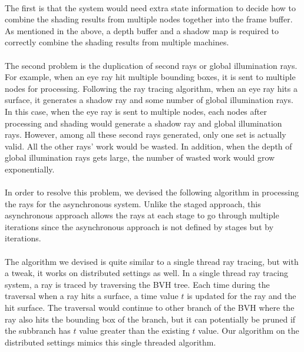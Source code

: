 \documentclass[a4paper, oneside, 10pt]{article}
\begin{document}
\paragraph{} The first is that the system would need extra state information to decide how to combine the shading results from multiple nodes together into the frame buffer. As mentioned in the above, a depth buffer and a shadow map is required to correctly combine the shading results from multiple machines. 
\paragraph{} The second problem is the duplication of second rays or global illumination rays. For example, when an eye ray hit multiple bounding boxes, it is sent to multiple nodes for processing. Following the ray tracing algorithm, when an eye ray hits a surface, it generates a shadow ray and some number of global illumination rays. In this case, when the eye ray is sent to multiple nodes, each nodes after processing and shading would generate a shadow ray and global illumination rays. However, among all these second rays generated, only one set is actually valid. All the other rays' work would be wasted. In addition, when the depth of global illumination rays gets large, the number of wasted work would grow exponentially. 
\paragraph{} In order to resolve this problem, we devised the following algorithm in processing the rays for the asynchronous system.  Unlike the staged approach, this asynchronous approach allows the rays at each stage to go through multiple iterations since the asynchronous approach is not defined by stages but by iterations.
\paragraph{} The algorithm we devised is quite similar to a single thread ray tracing, but with a tweak, it works on distributed settings as well.  In a single thread ray tracing system, a ray is traced by traversing the BVH tree. Each time during the traversal when a ray hits a surface, a time value $t$ is updated for the ray and the hit surface.  The traversal would continue to other branch of the BVH where the ray also hits the bounding box of the branch, but it can potentially be pruned if the subbranch has $t$ value greater than the existing $t$ value. Our algorithm on the distributed settings mimics this single threaded algorithm.
\end{document}
